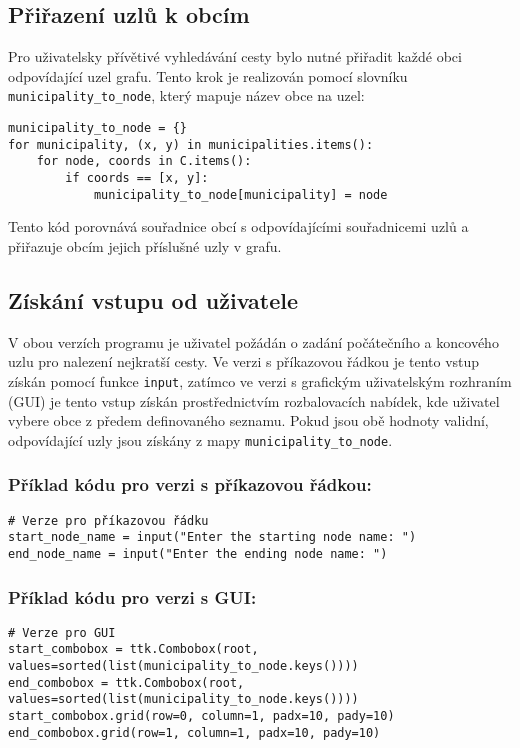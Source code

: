 \subsection{Přiřazení uzlů k obcím}
Pro uživatelsky přívětivé vyhledávání cesty bylo nutné přiřadit každé obci odpovídající uzel grafu. Tento krok je realizován pomocí slovníku \texttt{municipality\_to\_node}, který mapuje název obce na uzel:
\begin{verbatim}
municipality_to_node = {}
for municipality, (x, y) in municipalities.items():
    for node, coords in C.items():
        if coords == [x, y]:
            municipality_to_node[municipality] = node
\end{verbatim}
Tento kód porovnává souřadnice obcí s odpovídajícími souřadnicemi uzlů a přiřazuje obcím jejich příslušné uzly v grafu.

\subsection{Získání vstupu od uživatele}
V obou verzích programu je uživatel požádán o zadání počátečního a koncového uzlu pro nalezení nejkratší cesty. Ve verzi s příkazovou řádkou je tento vstup získán pomocí funkce \texttt{input}, zatímco ve verzi s grafickým uživatelským rozhraním (GUI) je tento vstup získán prostřednictvím rozbalovacích nabídek, kde uživatel vybere obce z předem definovaného seznamu. Pokud jsou obě hodnoty validní, odpovídající uzly jsou získány z mapy \texttt{municipality\_to\_node}.

\subsubsection*{Příklad kódu pro verzi s příkazovou řádkou:}
\begin{verbatim}
# Verze pro příkazovou řádku
start_node_name = input("Enter the starting node name: ")
end_node_name = input("Enter the ending node name: ")
\end{verbatim}

\subsubsection*{Příklad kódu pro verzi s GUI:}
\begin{verbatim}
# Verze pro GUI
start_combobox = ttk.Combobox(root, values=sorted(list(municipality_to_node.keys())))
end_combobox = ttk.Combobox(root, values=sorted(list(municipality_to_node.keys())))
start_combobox.grid(row=0, column=1, padx=10, pady=10)
end_combobox.grid(row=1, column=1, padx=10, pady=10)
\end{verbatim}

